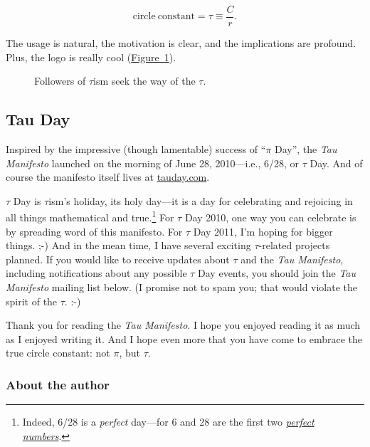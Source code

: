 \documentclass{article}
\begin{document}
\[
  \mathrm{circle\ constant} = \tau \equiv \frac{C}{r}.
\]

\noindent The usage is natural, the motivation is clear, and the implications are profound. Plus, the logo is really cool (\hyperref[fig:tauism]{Figure~}\ref{fig:tauism}).

\begin{figure}
\begin{center}
\end{center}
\caption{Followers of $\tau$ism seek the way of the $\tau$.\label{fig:tauism}}
\end{figure}

\subsection{Tau Day} %
\label{sec:tau_day}

Inspired by the impressive (though lamentable) success of ``$\pi$ Day'', the \emph{Tau Manifesto} launched on the morning of June 28, 2010---i.e., 6/28, or $\tau$ Day. And of course the manifesto itself lives at \href{http://tauday.com/}{tauday.com}.

$\tau$ Day is $\tau$ism's holiday, its holy day---it is a day for celebrating and rejoicing in all things mathematical and true.\footnote{Indeed, 6/28 is a \emph{perfect} day---for 6 and 28 are the first two \href{http://en.wikipedia.org/wiki/Perfect_number}{\emph{perfect numbers}}.} For $\tau$ Day 2010, one way you can celebrate is by spreading word of this manifesto. For $\tau$ Day 2011, I'm hoping for bigger things. ;-) And in the mean time, I have several exciting $\tau$-related projects planned. If you would like to receive updates about $\tau$ and the \emph{Tau Manifesto}, including notifications about any possible $\tau$ Day events, you should join the \emph{Tau Manifesto} mailing list below. (I promise not to spam you; that would violate the spirit of the $\tau$. :-)

Thank you for reading the \emph{Tau Manifesto}. I hope you enjoyed reading it as much as I enjoyed writing it. And I hope even more that you have come to embrace the true circle constant: not $\pi$, but $\tau$.


    \subsubsection{About the author} %
    \label{sec:about_the_author}
    
\end{document}
